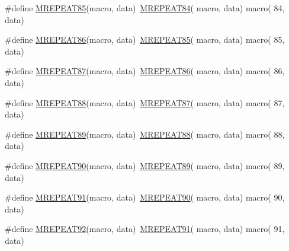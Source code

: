 \begin{DoxyCompactItemize}
\item 
\#define \mbox{\hyperlink{group__group__sam0__utils__mrepeat_gac310966754e3b2f99d3bc542eabbcd32}{M\+R\+E\+P\+E\+A\+T85}}(macro,  data)~\mbox{\hyperlink{group__group__sam0__utils__mrepeat_ga8892fab4572ce20132d8237a4fea0f3e}{M\+R\+E\+P\+E\+A\+T84}}( macro, data)   macro( 84, data)
\item 
\#define \mbox{\hyperlink{group__group__sam0__utils__mrepeat_ga30355c63cfe5a0c1ed9928f24d941206}{M\+R\+E\+P\+E\+A\+T86}}(macro,  data)~\mbox{\hyperlink{group__group__sam0__utils__mrepeat_gac310966754e3b2f99d3bc542eabbcd32}{M\+R\+E\+P\+E\+A\+T85}}( macro, data)   macro( 85, data)
\item 
\#define \mbox{\hyperlink{group__group__sam0__utils__mrepeat_gad120b88ef29e4f9b0f9017dc084674af}{M\+R\+E\+P\+E\+A\+T87}}(macro,  data)~\mbox{\hyperlink{group__group__sam0__utils__mrepeat_ga30355c63cfe5a0c1ed9928f24d941206}{M\+R\+E\+P\+E\+A\+T86}}( macro, data)   macro( 86, data)
\item 
\#define \mbox{\hyperlink{group__group__sam0__utils__mrepeat_ga7d45423a28a7d85979fa03dfe7b26fdd}{M\+R\+E\+P\+E\+A\+T88}}(macro,  data)~\mbox{\hyperlink{group__group__sam0__utils__mrepeat_gad120b88ef29e4f9b0f9017dc084674af}{M\+R\+E\+P\+E\+A\+T87}}( macro, data)   macro( 87, data)
\item 
\#define \mbox{\hyperlink{group__group__sam0__utils__mrepeat_gad01c89babbc1d97120f14f62818112d2}{M\+R\+E\+P\+E\+A\+T89}}(macro,  data)~\mbox{\hyperlink{group__group__sam0__utils__mrepeat_ga7d45423a28a7d85979fa03dfe7b26fdd}{M\+R\+E\+P\+E\+A\+T88}}( macro, data)   macro( 88, data)
\item 
\#define \mbox{\hyperlink{group__group__sam0__utils__mrepeat_gae85d4d27c3fbd9b354f04156111d089d}{M\+R\+E\+P\+E\+A\+T90}}(macro,  data)~\mbox{\hyperlink{group__group__sam0__utils__mrepeat_gad01c89babbc1d97120f14f62818112d2}{M\+R\+E\+P\+E\+A\+T89}}( macro, data)   macro( 89, data)
\item 
\#define \mbox{\hyperlink{group__group__sam0__utils__mrepeat_ga34182f160702d4e1b896298efc7eaaac}{M\+R\+E\+P\+E\+A\+T91}}(macro,  data)~\mbox{\hyperlink{group__group__sam0__utils__mrepeat_gae85d4d27c3fbd9b354f04156111d089d}{M\+R\+E\+P\+E\+A\+T90}}( macro, data)   macro( 90, data)
\item 
\#define \mbox{\hyperlink{group__group__sam0__utils__mrepeat_gad0cb974b5c2b9677a0127be09057faaf}{M\+R\+E\+P\+E\+A\+T92}}(macro,  data)~\mbox{\hyperlink{group__group__sam0__utils__mrepeat_ga34182f160702d4e1b896298efc7eaaac}{M\+R\+E\+P\+E\+A\+T91}}( macro, data)   macro( 91, data)

\end{DoxyCompactItemize}
